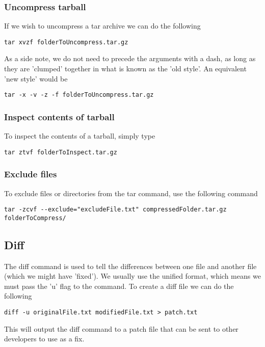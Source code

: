 \documentclass[a4paper, 10pt]{article}
\begin{document}
\subsubsection*{Uncompress tarball}
\label{sec:uncompress-tarball}

If we wish to uncompress a tar archive we can do the following
\begin{verbatim}
tar xvzf folderToUncompress.tar.gz
\end{verbatim}
As a side note, we do not need to precede the arguments with a dash,
as long as they are 'clumped' together in what is known as the 'old
style'. An equivalent 'new style' would be
\begin{verbatim}
tar -x -v -z -f folderToUncompress.tar.gz
\end{verbatim}

\subsubsection*{Inspect contents of tarball}
\label{sec:insp-cont-tarb}

To inspect the contents of a tarball, simply type
\begin{verbatim}
tar ztvf folderToInspect.tar.gz
\end{verbatim}

\subsubsection*{Exclude files}
\label{sec:exclude-files}

To exclude files or directories from the tar command, use the
following command
\begin{verbatim}
tar -zcvf --exclude="excludeFile.txt" compressedFolder.tar.gz folderToCompress/
\end{verbatim}

\subsection*{Diff}
\label{sec:diff}

The diff command is used to tell the differences between one file and
another file (which we might have 'fixed'). We usually use the unified
format, which means we must pass the 'u' flag to the command. To
create a diff file we can do the following
\begin{verbatim}
diff -u originalFile.txt modifiedFile.txt > patch.txt
\end{verbatim}
This will output the diff command to a patch file that can be sent to
other developers to use as a fix.
\end{document}
